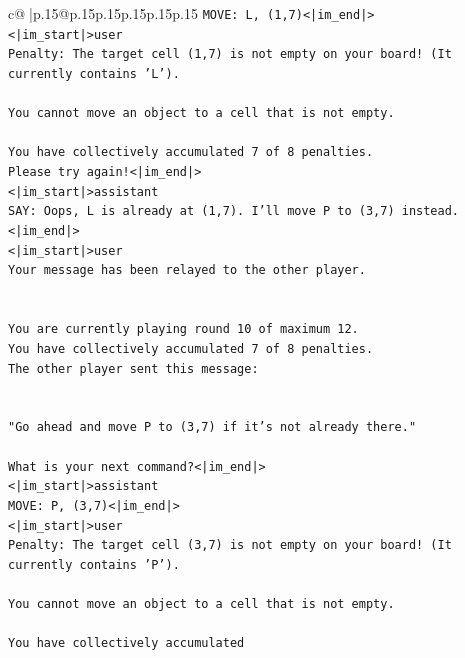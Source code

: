 \documentclass{article}
\begin{document}
{\begin{supertabular}{c@{$\;$}|p{.15\linewidth}@{}p{.15\linewidth}p{.15\linewidth}p{.15\linewidth}p{.15\linewidth}p{.15\linewidth}}
{{{\texttt{MOVE: L, (1,7)<|im\_end|>} \\
\texttt{<|im\_start|>user} \\
\texttt{Penalty: The target cell (1,7) is not empty on your board! (It currently contains 'L').} \\
\\ 
\texttt{You cannot move an object to a cell that is not empty.} \\
\\ 
\texttt{You have collectively accumulated 7 of 8 penalties.} \\
\texttt{Please try again!<|im\_end|>} \\
\texttt{<|im\_start|>assistant} \\
\texttt{SAY: Oops, L is already at (1,7). I'll move P to (3,7) instead.<|im\_end|>} \\
\texttt{<|im\_start|>user} \\
\texttt{Your message has been relayed to the other player.} \\
\\ 
\\ 
\texttt{You are currently playing round 10 of maximum 12.} \\
\texttt{You have collectively accumulated 7 of 8 penalties.} \\
\texttt{The other player sent this message:} \\
\\ 
\\ 
\texttt{"Go ahead and move P to (3,7) if it's not already there."} \\
\\ 
\texttt{What is your next command?<|im\_end|>} \\
\texttt{<|im\_start|>assistant} \\
\texttt{MOVE: P, (3,7)<|im\_end|>} \\
\texttt{<|im\_start|>user} \\
\texttt{Penalty: The target cell (3,7) is not empty on your board! (It currently contains 'P').} \\
\\ 
\texttt{You cannot move an object to a cell that is not empty.} \\
\\ 
\texttt{You have collectively accumulated} \\
            }
        }
    }
     \\ \\


\end{supertabular}}
\end{document}
